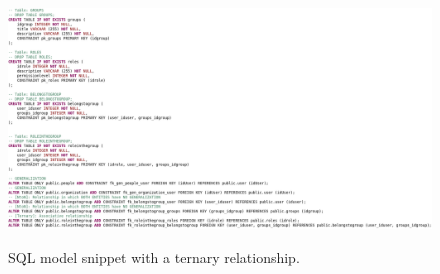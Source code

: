 \begin{figure}[!htb]
    \centering
    \caption{SQL model snippet with a ternary relationship.}
    \includegraphics[width=\textwidth]{img/SQL_Ternary.png}
    \label{fig:SQL_Ternary}
\end{figure}


